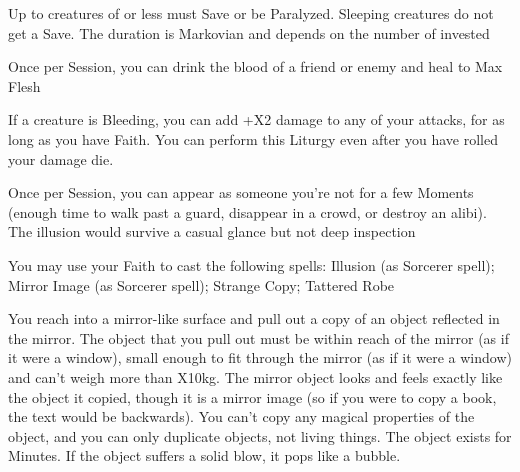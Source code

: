 {Up to \DICE creatures of \DICE \HD or less must Save or be Paralyzed.  Sleeping creatures do not get a Save. The duration is Markovian and depends on the number of \DICE invested



\GOD[
Name=Shezmu,
Link=small-god-shezmu,
GodOf=Prince of Blood,
Holy=a vial of blood other than your own (preferably the blood of the one who indoctrinated you into the faith)
]


Once per Session, you can drink the blood of a friend or enemy and heal to Max Flesh


If a creature is Bleeding, you can add +\DICE X2 damage to any of your attacks, for as long as you have Faith.  You can perform this Liturgy even after you have rolled your damage die.




\GOD[
Name=The King in Yellow,
Link=small-god-the king in yellow,
GodOf=Fiend of Illusion and Disguises,
Holy=a yellow cowl and mask
]


Once per Session, you can appear as someone you're not for a few Moments (enough time to walk past a guard, disappear in a crowd, or destroy an alibi).  The illusion would survive a casual glance but not deep inspection


You may use your Faith to cast the following spells: Illusion (as Sorcerer spell); Mirror Image (as Sorcerer spell); Strange Copy; Tattered Robe

\LITURGY [
  Name= Strange Copy,
  Link= king-in-yellow-liturgy-strange-copy,
  Paradigm= Mind ,
  Save=  N ,
  Duration= \SUMDICE Minutes ,
  Counter=  n/a  ,
  Keywords= None ,
  Target=   Close (touch) mirror
]



You reach into a mirror-like surface and pull out a copy of an object reflected in the mirror. The object that you pull out must be within reach of the mirror (as if it were a window), small enough to fit through the mirror (as if it were a window) and can't weigh more than \DICE X10kg. The mirror object looks and feels exactly like the object it copied, though it is a mirror image (so if you were to copy a book, the text would be backwards).  You can't copy any magical properties of the object, and you can only duplicate objects, not living things.  The object exists for \SUMDICE Minutes.  If the object suffers a solid blow, it pops like a bubble.

}
